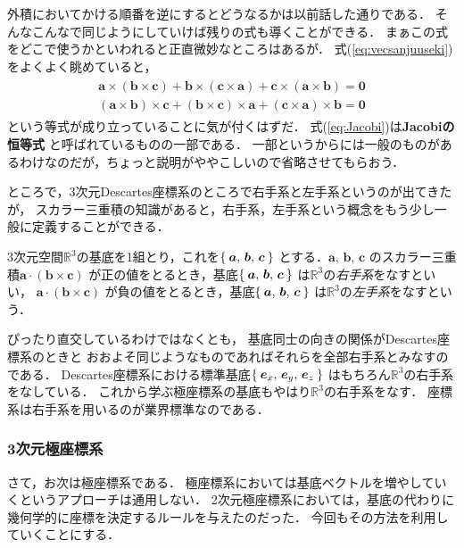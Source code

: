 外積においてかける順番を逆にするとどうなるかは以前話した通りである．
そんなこんなで同じようにしていけば残りの式も導くことができる．
まぁこの式をどこで使うかといわれると正直微妙なところはあるが．
式(\ref{eq:vecsanjuuseki})をよくよく眺めていると，
\begin{align}
\begin{aligned}
\bm{a} \times ( \bm{b} \times \bm{c} ) + \bm{b} \times ( \bm{c} \times \bm{a} ) + 
\bm{c} \times ( \bm{a} \times \bm{b} ) = \bm{0} \\
( \bm{a} \times  \bm{b} ) \times \bm{c} + ( \bm{b} \times  \bm{c} ) \times \bm{a} +
( \bm{c} \times  \bm{a} ) \times \bm{b} = \bm{0}
\label{eq:Jacobi}
\end{aligned}
\end{align}
という等式が成り立っていることに気が付くはずだ．
式(\ref{eq:Jacobi})は\textbf{Jacobiの恒等式}
と呼ばれているものの一部である．
一部というからには一般のものがあるわけなのだが，ちょっと説明がややこしいので省略させてもらおう．

ところで，3次元Descartes座標系のところで右手系と左手系というのが出てきたが，
スカラー三重積の知識があると，右手系，左手系という概念をもう少し一般に定義することができる．

3次元空間$\mathbb{R}^3$の基底を1組とり，これを$\Set{ \bm{a} , \, \bm{b} , \, \bm{c} }$
とする．$\bm{a} , \, \bm{b} , \, \bm{c}$
のスカラー三重積$\bm{a} \cdot ( \bm{b} \times \bm{c} )$
が正の値をとるとき，基底$\Set{ \bm{a} , \, \bm{b} , \, \bm{c} }$
は$\mathbb{R}^3$の\emph{右手系}をなすといい，
$\bm{a} \cdot ( \bm{b} \times \bm{c} )$
が負の値をとるとき，基底$\Set{ \bm{a} , \, \bm{b} , \, \bm{c} }$
は$\mathbb{R}^3$の\emph{左手系}をなすという．

ぴったり直交しているわけではなくとも，
基底同士の向きの関係がDescartes座標系のときと
おおよそ同じようなものであればそれらを全部右手系とみなすのである．
Descartes座標系における標準基底$\Set{ \bm{e}_x , \, \bm{e}_y, \, \bm{e}_z }$
はもちろん$\mathbb{R}^3$の右手系をなしている．
これから学ぶ極座標系の基底もやはり$\mathbb{R}^3$の右手系をなす．
座標系は右手系を用いるのが業界標準なのである．

\subsubsection{3次元極座標系}
さて，お次は極座標系である．
極座標系においては基底ベクトルを増やしていくというアプローチは通用しない．
2次元極座標系においては，基底の代わりに幾何学的に座標を決定するルールを与えたのだった．
今回もその方法を利用していくことにする．

